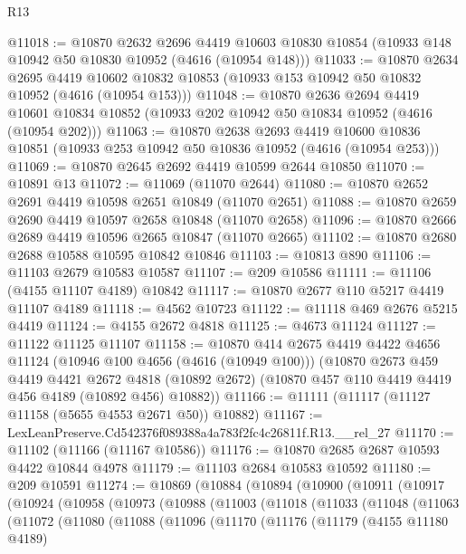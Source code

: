 \begin{lexlean}{R13}
\begin{coremodule}
@11018 := @10870
    @2632
    @2696
    @4419
    @10603
    @10830
    @10854
    (@10933 @148 @10942 @50 @10830 @10952 (@4616 (@10954 @148)))
@11033 := @10870
    @2634
    @2695
    @4419
    @10602
    @10832
    @10853
    (@10933 @153 @10942 @50 @10832 @10952 (@4616 (@10954 @153)))
@11048 := @10870
    @2636
    @2694
    @4419
    @10601
    @10834
    @10852
    (@10933 @202 @10942 @50 @10834 @10952 (@4616 (@10954 @202)))
@11063 := @10870
    @2638
    @2693
    @4419
    @10600
    @10836
    @10851
    (@10933 @253 @10942 @50 @10836 @10952 (@4616 (@10954 @253)))
@11069 := @10870 @2645 @2692 @4419 @10599 @2644 @10850
@11070 := @10891 @13
@11072 := @11069 (@11070 @2644)
@11080 := @10870 @2652 @2691 @4419 @10598 @2651 @10849 (@11070 @2651)
@11088 := @10870 @2659 @2690 @4419 @10597 @2658 @10848 (@11070 @2658)
@11096 := @10870 @2666 @2689 @4419 @10596 @2665 @10847 (@11070 @2665)
@11102 := @10870 @2680 @2688 @10588 @10595 @10842 @10846
@11103 := @10813 @890
@11106 := @11103 @2679 @10583 @10587
@11107 := @209 @10586
@11111 := @11106 (@4155 @11107 @4189) @10842
@11117 := @10870 @2677 @110 @5217 @4419 @11107 @4189
@11118 := @4562 @10723
@11122 := @11118 @469 @2676 @5215 @4419
@11124 := @4155 @2672 @4818
@11125 := @4673 @11124
@11127 := @11122 @11125 @11107
@11158 := @10870
    @414
    @2675
    @4419
    @4422
    @4656
    @11124
    (@10946 @100 @4656 (@4616 (@10949 @100)))
    (@10870
      @2673
      @459
      @4419
      @4421
      @2672
      @4818
      (@10892 @2672)
      (@10870 @457 @110 @4419 @4419 @456 @4189 (@10892 @456) @10882))
@11166 := @11111 (@11117 (@11127 @11158 (@5655 @4553 @2671 @50)) @10882)
@11167 := LexLeanPreserve.Cd542376f089388a4a783f2fc4c26811f.R13.__rel_27
@11170 := @11102 (@11166 (@11167 @10586))
@11176 := @10870 @2685 @2687 @10593 @4422 @10844 @4978
@11179 := @11103 @2684 @10583 @10592
@11180 := @209 @10591
@11274 := @10869
    (@10884
      (@10894
        (@10900
          (@10911
            (@10917
              (@10924
                (@10958
                  (@10973
                    (@10988
                      (@11003
                        (@11018
                          (@11033
                            (@11048
                              (@11063
                                (@11072
                                  (@11080
                                    (@11088
                                      (@11096
                                        (@11170
                                          (@11176
                                            (@11179
                                              (@4155 @11180 @4189)

\end{coremodule}
\end{lexlean}
